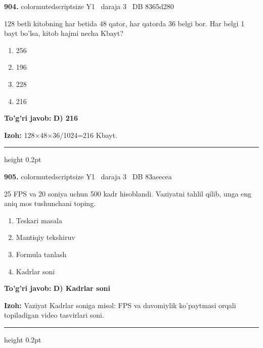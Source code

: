 \documentclass[10pt,a4paper,oneside]{article}
\begin{document}
\noindent\textbf{\color{ink}904.}  {color{muted}scriptsize Y1 \textbullet\ daraja 3 \textbullet\ DB 8365d280}
\par
128 betli kitobning har betida 48 qator, har qatorda 36 belgi bor. Har belgi 1 bayt bo'lsa, kitob hajmi necha Kbayt?
\begin{enumerate}[label=\Alph*),leftmargin=9mm]
\item 256
\item 196
\item 228
\item 216
\end{enumerate}
\begin{tcolorbox}[enhanced,breakable,colback=teal!4,colframe=teal!50!black,boxrule=0.5pt,arc=1.1mm,left=3mm,right=3mm,top=1.7mm,bottom=1.7mm,before skip=2mm,after skip=2mm]
\textbf{\color{teal}To'g'ri javob:} \textbf{D) 216}
\par\smallskip
\textbf{Izoh:} 128\ensuremath{\times}48\ensuremath{\times}36/1024=216 Kbayt.
\end{tcolorbox}
\vspace{2mm}\hrule height 0.2pt \vspace{3mm}

\noindent\textbf{\color{ink}905.}  {color{muted}scriptsize Y1 \textbullet\ daraja 3 \textbullet\ DB 83aeecea}
\par
25 FPS va 20 soniya uchun 500 kadr hisoblandi. Vaziyatni tahlil qilib, unga eng aniq mos tushunchani toping.
\begin{enumerate}[label=\Alph*),leftmargin=9mm]
\item Teskari masala
\item Mantiqiy tekshiruv
\item Formula tanlash
\item Kadrlar soni
\end{enumerate}
\begin{tcolorbox}[enhanced,breakable,colback=teal!4,colframe=teal!50!black,boxrule=0.5pt,arc=1.1mm,left=3mm,right=3mm,top=1.7mm,bottom=1.7mm,before skip=2mm,after skip=2mm]
\textbf{\color{teal}To'g'ri javob:} \textbf{D) Kadrlar soni}
\par\smallskip
\textbf{Izoh:} Vaziyat Kadrlar soniga misol: FPS va davomiylik ko'paytmasi orqali topiladigan video tasvirlari soni.
\end{tcolorbox}
\vspace{2mm}\hrule height 0.2pt \vspace{3mm}
\end{document}
